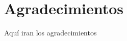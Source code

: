 \newpage

\section*{Agradecimientos}

Aquí iran los agradecimientos

	
\begin{flushright}

\end{flushright}
\begin{flushright}

\end{flushright}
